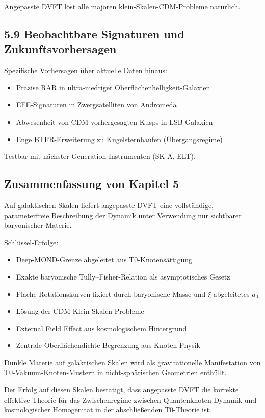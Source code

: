 \documentclass[12pt,a4paper]{article}
\begin{document}
	Angepasste DVFT löst alle majoren klein-Skalen-CDM-Probleme natürlich.
	
	\subsection{5.9 Beobachtbare Signaturen und Zukunftsvorhersagen}
	
	Spezifische Vorhersagen über aktuelle Daten hinaus:
	\begin{itemize}
		\item Präzise RAR in ultra-niedriger Oberflächenhelligkeit-Galaxien
		\item EFE-Signaturen in Zwergsatelliten von Andromeda
		\item Abwesenheit von CDM-vorhergesagten Kusps in LSB-Galaxien
		\item Enge BTFR-Erweiterung zu Kugelsternhaufen (Übergangsregime)
	\end{itemize}
	
	Testbar mit nächster-Generation-Instrumenten (SK A, ELT).
	
	\subsection{Zusammenfassung von Kapitel 5}
	
	Auf galaktischen Skalen liefert angepasste DVFT eine vollständige, parameterfreie Beschreibung der Dynamik unter Verwendung nur sichtbarer baryonischer Materie.
	
	Schlüssel-Erfolge:
	\begin{itemize}
		\item Deep-MOND-Grenze abgeleitet aus T0-Knotensättigung
		\item Exakte baryonische Tully–Fisher-Relation als asymptotisches Gesetz
		\item Flache Rotationskurven fixiert durch baryonische Masse und $\xi$-abgeleitetes $a_0$
		\item Lösung der CDM-Klein-Skalen-Probleme
		\item External Field Effect aus kosmologischem Hintergrund
		\item Zentrale Oberflächendichte-Begrenzung aus Knoten-Physik
	\end{itemize}
	
	Dunkle Materie auf galaktischen Skalen wird als gravitationelle Manifestation von T0-Vakuum-Knoten-Mustern in nicht-sphärischen Geometrien enthüllt.
	
	Der Erfolg auf diesen Skalen bestätigt, dass angepasste DVFT die korrekte effektive Theorie für das Zwischenregime zwischen Quantenknoten-Dynamik und kosmologischer Homogenität in der abschließenden T0-Theorie ist.
	
\end{document}
